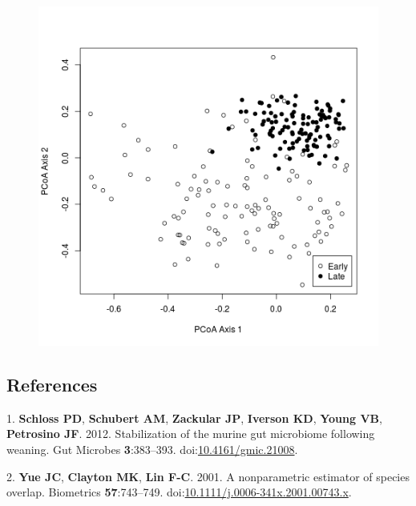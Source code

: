 \documentclass[11pt,]{article}
\begin{document}
\begin{figure}[htbp]
\centering
\includegraphics{../results/figures/pcoa_figure.png}
\caption{}
\end{figure}

\newpage

\subsection*{References}\label{references}

\hypertarget{refs}{}
\hypertarget{ref-Schloss2012}{}
1. \textbf{Schloss PD}, \textbf{Schubert AM}, \textbf{Zackular JP},
\textbf{Iverson KD}, \textbf{Young VB}, \textbf{Petrosino JF}. 2012.
Stabilization of the murine gut microbiome following weaning. Gut
Microbes \textbf{3}:383--393.
doi:\href{https://doi.org/10.4161/gmic.21008}{10.4161/gmic.21008}.

\hypertarget{ref-Yue2001}{}
2. \textbf{Yue JC}, \textbf{Clayton MK}, \textbf{Lin F-C}. 2001. A
nonparametric estimator of species overlap. Biometrics
\textbf{57}:743--749.
doi:\href{https://doi.org/10.1111/j.0006-341x.2001.00743.x}{10.1111/j.0006-341x.2001.00743.x}.
\end{document}
